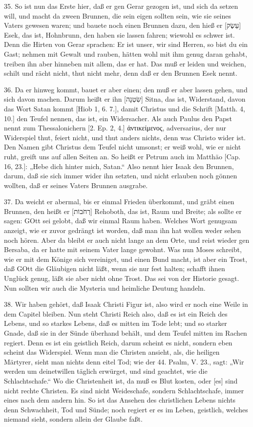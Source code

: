 35. So ist nun das Erste hier, daß er gen Gerar gezogen ist, und sich da setzen will, und macht da zween Brunnen, die sein eigen sollten sein, wie sie seines Vaters gewesen waren; und bauete noch einen Brunnen dazu, den hieß er [עֵשֶׂק] Esek, das ist, Hohnbrunn, den haben sie lassen fahren; wiewohl es schwer ist. Denn die Hirten von Gerar sprachen: Er ist unser, wir sind Herren, so bist du ein Gast; nehmen mit Gewalt und rauben, hätten wohl mit ihm genug daran gehabt, treiben ihn aber hinneben mit allem, das er hat. Das muß er leiden und weichen, schilt und rächt nicht, thut nicht mehr, denn daß er den Brunnen Esek nennt.

36. Da er hinweg kommt, bauet er aber einen; den muß er aber lassen gehen, und sich davon machen. Darum heißt er ihn [שִׂטְנָה] Sitna, das ist, Widerstand, davon das Wort Satan kommt [Hiob 1, 6. 7.], damit Christus und die Schrift [Matth. 4, 10.] den Teufel nennen, das ist, ein Widersacher. Als auch Paulus den Papst nennt zum Thessalonichern [2. Ep. 2, 4.] ἀντικείμενος, adversarius, der nur Widerspiel thut, feiert nicht, und thut anders nichts, denn was Christo wider ist. Den Namen gibt Christus dem Teufel nicht umsonst; er weiß wohl, wie er nicht ruht, greift uns auf allen Seiten an. So heißt er Petrum auch im Matthäo [Cap. 16, 23.]: „Hebe dich hinter mich, Satan.“ Also nennt hier Isaak den Brunnen, darum, daß sie sich immer wider ihn setzten, und nicht erlauben noch gönnen wollten, daß er seines Vaters Brunnen ausgrabe.

37. Da weicht er abermal, bis er einmal Frieden überkommt, und gräbt einen Brunnen, den heißt er [רְחֹבוֹת] Rehoboth, das ist, Raum und Breite; als sollte er sagen: GOtt sei gelobt, daß wir einmal Raum haben. Welches Wort genugsam anzeigt, wie er zuvor gedrängt ist worden, daß man ihn hat wollen weder sehen noch hören. Aber da bleibt er auch nicht lange an dem Orte, und reist wieder gen Bersaba, da er hatte mit seinem Vater lange gewohnt. Was nun Moses schreibt, wie er mit dem Könige sich vereiniget, und einen Bund macht, ist aber ein Trost, daß GOtt die Gläubigen nicht läßt, wenn sie nur fest halten; schafft ihnen Unglück genug, läßt sie aber nicht ohne Trost. Das sei von der Historie gesagt. Nun sollten wir auch die Mysteria und heimliche Deutung handeln.

38. Wir haben gehört, daß Isaak Christi
Figur ist, also wird er noch eine Weile in dem Capitel bleiben. Nun steht Christi Reich also, daß es ist ein Reich des Lebens, und so starkes Lebens, daß es mitten im Tode lebt; und so starker Gnade, daß sie in der Sünde überhand behält, und dem Teufel mitten im Rachen regiert. Denn es ist ein geistlich Reich, darum scheint es nicht, sondern eben scheint das Widerspiel. Wenn man die Christen ansieht, als, die heiligen Märtyrer, sieht man nichts denn eitel Tod; wie der 44. Psalm, V. 23., sagt: „Wir werden um deinetwillen täglich erwürget, und sind geachtet, wie die Schlachtschafe.“ Wo die Christenheit ist, da muß es Blut kosten, oder [es] sind nicht rechte Christen. Es sind nicht Weideschafe, sondern Schlachtschafe, immer eines nach dem andern hin. So ist das Ansehen des christlichen Lebens nichts denn Schwachheit, Tod und Sünde; noch regiert er es im Leben, geistlich, welches niemand sieht, sondern allein der Glaube faßt.

